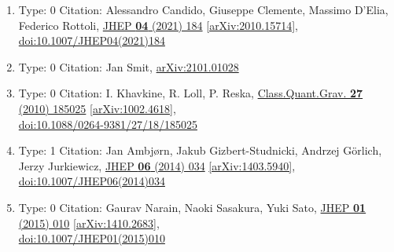 \documentclass[a4paper,10pt]{article}
\begin{document}
\begin{enumerate}
\begin{enumerate}
  \item Type: 0 Citation: Alessandro Candido, Giuseppe Clemente, Massimo D'Elia, Federico Rottoli, \href{https://www.doi.org/10.1007/JHEP04(2021)184}{JHEP {\bf 04} (2021) 184}  \href{https://arxiv.org/abs/2010.15714}{[arXiv:2010.15714]},\\\href{https://www.doi.org/10.1007/JHEP04(2021)184}{doi:10.1007/JHEP04(2021)184}
  \item Type: 0 Citation: Jan Smit, \href{https://arxiv.org/abs/2101.01028}{arXiv:2101.01028}
  \item Type: 0 Citation: I. Khavkine, R. Loll, P. Reska, \href{https://www.doi.org/10.1088/0264-9381/27/18/185025}{Class.Quant.Grav. {\bf 27} (2010) 185025}  \href{https://arxiv.org/abs/1002.4618}{[arXiv:1002.4618]},\\\href{https://www.doi.org/10.1088/0264-9381/27/18/185025}{doi:10.1088/0264-9381/27/18/185025}
  \item Type: 1 Citation: Jan Ambjørn, Jakub Gizbert-Studnicki, Andrzej Görlich, Jerzy Jurkiewicz, \href{https://www.doi.org/10.1007/JHEP06(2014)034}{JHEP {\bf 06} (2014) 034}  \href{https://arxiv.org/abs/1403.5940}{[arXiv:1403.5940]},\\\href{https://www.doi.org/10.1007/JHEP06(2014)034}{doi:10.1007/JHEP06(2014)034}
  \item Type: 0 Citation: Gaurav Narain, Naoki Sasakura, Yuki Sato, \href{https://www.doi.org/10.1007/JHEP01(2015)010}{JHEP {\bf 01} (2015) 010}  \href{https://arxiv.org/abs/1410.2683}{[arXiv:1410.2683]},\\\href{https://www.doi.org/10.1007/JHEP01(2015)010}{doi:10.1007/JHEP01(2015)010}

\end{enumerate}
\end{enumerate}
\end{document}

